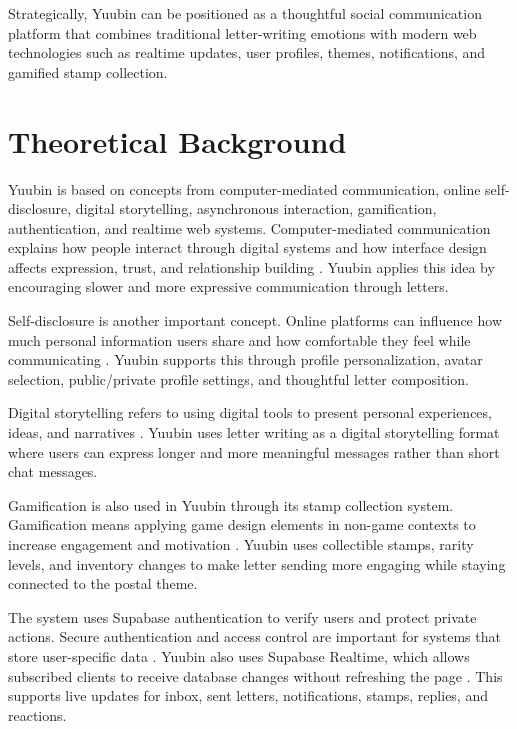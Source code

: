 ﻿\documentclass[12pt,a4paper]{report}
\begin{document}
Strategically, Yuubin can be positioned as a thoughtful social communication platform that combines traditional letter-writing emotions with modern web technologies such as realtime updates, user profiles, themes, notifications, and gamified stamp collection.

\section{Theoretical Background}

Yuubin is based on concepts from computer-mediated communication, online self-disclosure, digital storytelling, asynchronous interaction, gamification, authentication, and realtime web systems. Computer-mediated communication explains how people interact through digital systems and how interface design affects expression, trust, and relationship building \cite{walther1996cmc}. Yuubin applies this idea by encouraging slower and more expressive communication through letters.

Self-disclosure is another important concept. Online platforms can influence how much personal information users share and how comfortable they feel while communicating \cite{joinson2001selfdisclosure}. Yuubin supports this through profile personalization, avatar selection, public/private profile settings, and thoughtful letter composition.

Digital storytelling refers to using digital tools to present personal experiences, ideas, and narratives \cite{lambert2013digitalstorytelling}. Yuubin uses letter writing as a digital storytelling format where users can express longer and more meaningful messages rather than short chat messages.

Gamification is also used in Yuubin through its stamp collection system. Gamification means applying game design elements in non-game contexts to increase engagement and motivation \cite{deterding2011gamification}. Yuubin uses collectible stamps, rarity levels, and inventory changes to make letter sending more engaging while staying connected to the postal theme.

The system uses Supabase authentication to verify users and protect private actions. Secure authentication and access control are important for systems that store user-specific data \cite{nist_auth,owasp_authentication}. Yuubin also uses Supabase Realtime, which allows subscribed clients to receive database changes without refreshing the page \cite{supabase_realtime}. This supports live updates for inbox, sent letters, notifications, stamps, replies, and reactions.
\end{document}
